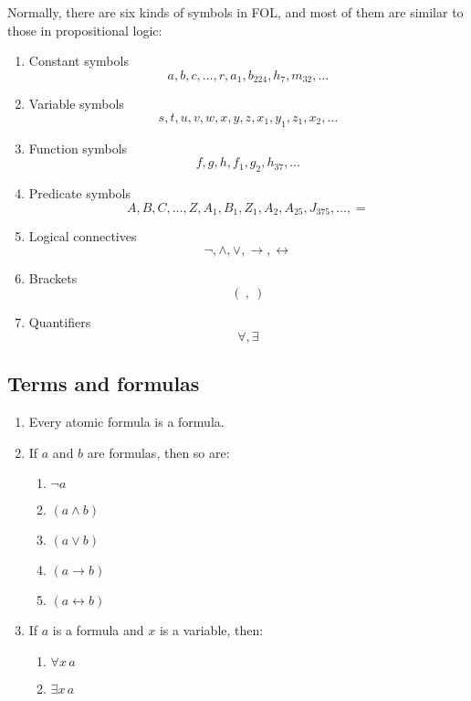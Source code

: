 \documentclass[12pt,a4paper,openany]{article}
\begin{document}
Normally, there are six kinds of symbols in FOL, and most of them are
similar to those in propositional logic:

\begin{enumerate}
\item
  Constant symbols
  \[a, b, c, \dots, r, a_1, b_{224}, h_7, m_{32}, \dots\]
\item
  Variable symbols \[s, t, u, v, w, x, y, z, x_1, y_1, z_1, x_2, \dots\]
\item
  Function symbols \[f, g, h, f_1, g_2, h_{37}, \dots\]
\item
  Predicate symbols
  \[A, B, C, \dots, Z, A_1, B_1, Z_1, A_2, A_{25}, J_{375}, \dots, =\]
\item
  Logical connectives \[\lnot, \land, \lor, \to, \leftrightarrow\]
\item
  Brackets \[( \ , \ )\]
\item
  Quantifiers \[\forall, \exists\]
\end{enumerate}

\subsection{Terms and formulas}\label{terms-and-formulas}

\begin{enumerate}
\def\labelenumi{\arabic{enumi}.}
\item
  Every atomic formula is a formula.
\item
  If \(a\) and \(b\) are formulas, then so are:

  \begin{enumerate}
  \def\labelenumii{\arabic{enumii}.}
  \item
    \(\lnot a\)
  \item
    \((a \land b)\)
  \item
    \((a \lor b)\)
  \item
    \((a \to b)\)
  \item
    \((a \leftrightarrow b)\)
  \end{enumerate}
\item
  If \(a\) is a formula and \(x\) is a variable, then:

  \begin{enumerate}
  \def\labelenumii{\arabic{enumii}.}
  \item
    \(\forall x \, a\)
  \item
    \(\exists x \, a\)
  \end{enumerate}
\end{enumerate}
\end{document}
